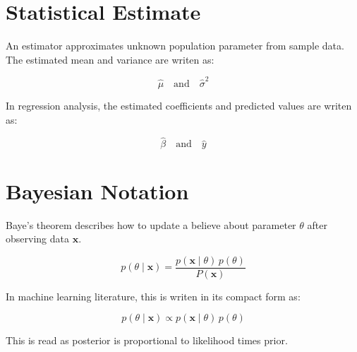 \documentclass[11pt]{article}
\begin{document}
\section*{Statistical Estimate}

An estimator approximates unknown population parameter from sample data. The estimated mean and variance are writen as:

\[
\hat{\mu} \quad \text{and} \quad \hat{\sigma}^2
\]

In regression analysis, the estimated coefficients and predicted values are writen as:

\[
\hat{\beta} \quad \text{and} \quad \hat{y}
\]

\section*{Bayesian Notation}

Baye's theorem describes how to update a believe about parameter $\theta$ after observing data $\mathbf{x}$.

\[
p(\theta \mid \mathbf{x}) = \frac{p(\mathbf{x}\mid\theta)\,p(\theta)}{P(\mathbf{x})}
\]

In machine learning literature, this is writen in its compact form as:

\[
p(\theta \mid \mathbf{x}) \propto p(\mathbf{x} \mid \theta) \, p(\theta)
\]

This is read as posterior is proportional to likelihood times prior.
\end{document}
